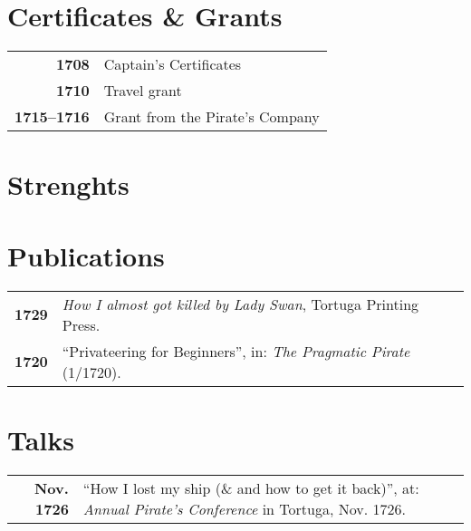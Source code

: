 \documentclass[10pt]{article}
\begin{document}
\begin{minipage}[t]{0.45\textwidth}
\vspace{2em}
\section*{Certificates \& Grants}
\begin{tabular}{>{\footnotesize\bfseries}r >{\footnotesize}p{}}
    1708 & Captain's Certificates \\
    1710 & Travel grant \\
    1715--1716 & Grant from the Pirate's Company
\end{tabular}
\bigskip

\section*{Strenghts}

\end{minipage}\hfill
\begin{minipage}[t]{0.5\textwidth}
\vspace{2em}
\section*{Publications}
\begin{tabular}{>{\footnotesize\bfseries}r >{\footnotesize}p{}}
    1729 & \emph{How I almost got killed by Lady Swan}, Tortuga Printing Press. \\
    1720 & ``Privateering for Beginners'', in: \emph{The Pragmatic Pirate} (1/1720).
\end{tabular}
\bigskip

\section*{Talks}
\begin{tabular}{>{\footnotesize\bfseries}r >{\footnotesize}p{}}
    Nov. 1726 & ``How I lost my ship (\& and how to get it back)'', at: \emph{Annual Pirate's Conference} in Tortuga, Nov. 1726.
\end{tabular}
\end{minipage}


\vspace{1em}



\end{document}
